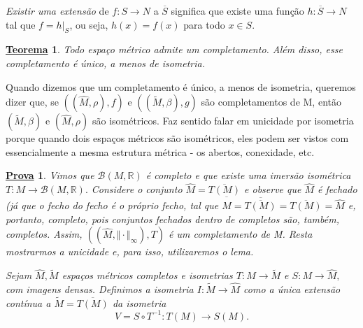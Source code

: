 \documentclass{article}
\newtheorem*{theorem*}{\underline{Teorema}}
\newtheorem*{proof*}{\underline{Prova}}
\begin{document}
  \textit{Existir uma extensão} de \(f:S\rightarrow N\) a \(\overline{S}\) significa que existe uma função \(h:\overline{S}\rightarrow N\) tal que \(f = h |_S\), ou seja,
 \(h(x) = f(x)\) para todo \(x\in S\).
\begin{theorem*}
  Todo espaço métrico admite um completamento. Além disso, esse completamento é único, a menos de isometria.  
\end{theorem*}
  Quando dizemos que um completamento é único, a menos de isometria, queremos dizer que, se \(((\hat{M}, \rho ), f)\) e \(((\tilde{M}, \beta ), g)\) são completamentos de M,
então \((\tilde{M}, \beta )\) e \((\hat{M}, \rho )\) são isométricos. Faz sentido falar em unicidade por isometria porque quando dois espaços métricos são isométricos, eles podem
ser vistos com essencialmente a mesma estrutura métrica - os abertos, conexidade, etc. 
\begin{proof*}
  Vimos que \(\mathcal{B}(M, \mathbb{R})\) é completo e que existe uma imersão isométrica \(T:M\rightarrow \mathcal{B}(M, \mathbb{R}).\) Considere o conjunto \(\hat{M} = \overline{T(M)}\)
e observe que \(\hat{M}\) é fechado (já que o fecho do fecho é o próprio fecho, tal que \(\overline{\hat{M}} = \overline{\overline{T(M)}} = \overline{T(M)} = \hat{M}\) e, portanto,
completo, pois conjuntos fechados dentro de completos são, também, completos. Assim, \(((\hat{M}, \Vert \cdot \Vert _{\infty}), T)\) é um completamento de M. Resta mostrarmos a unicidade e, para
isso, utilizaremos o lema.

  Sejam \(\hat{M}, \tilde{M}\) espaços métricos completos e isometrias \(T:M\rightarrow \tilde{M}\) e \(S:M\rightarrow \hat{M},\) com imagens densas. Definimos a isometria
 \(I:\tilde{M}\rightarrow \hat{M}\) como a única extensão contínua a \(\tilde{M} = \overline{T(M)}\) da isometria 
  \[
    V = S \circ{T^{-1}}:T(M)\rightarrow S(M).
  \]
\end{proof*}
\end{document}
